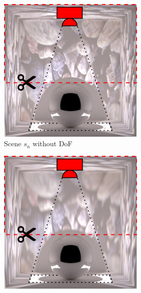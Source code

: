 \begin{figure}[]
    \centering    
    \begin{subfigure}{\textwidth}
        \centering
        \hfill
        \begin{subfigure}{0.32\textwidth}
            \centering
            \includegraphics[width=\textwidth]{images/04-experiment03/dof/scene_highlighted.jpg}
            \caption{Scene \(s_n\) without DoF}
            \label{fig:ex03-dof-normal_scene}
        \end{subfigure}
        \hspace*{0.5mm}
        \begin{subfigure}{0.32\textwidth}
            \centering
            \includegraphics[width=\textwidth]{images/04-experiment03/dof/scene_dof_highlighted.jpg}

\end{subfigure}
\end{subfigure}
\end{figure}

